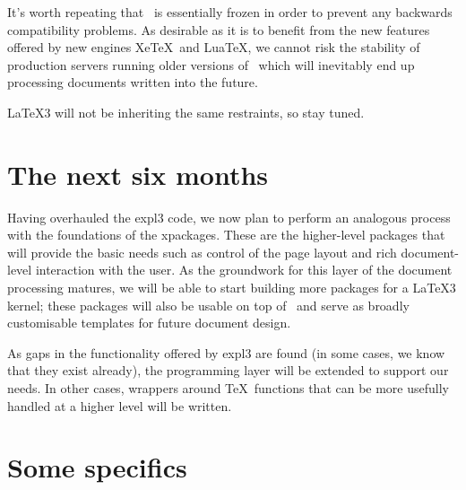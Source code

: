 \documentclass{ltnews}
\begin{document}
It's worth repeating that \LaTeXe\ is essentially frozen in order to
prevent any backwards compatibility problems. As desirable as it is
to benefit from the new features offered by new engines Xe\TeX\ and
Lua\TeX, we cannot risk the stability of production servers running
older versions of \LaTeXe\ which will inevitably end up processing
documents written into the future.

\LaTeX3 will not be inheriting the same restraints, so stay tuned.

\newpage
\section{The next six months}

Having overhauled the \textsf{expl3} code, we now plan to perform an
analogous process with the foundations of the
\textsf{xpackages}. These are the higher-level packages that will
provide the basic needs such as control of the page layout and rich
document-level interaction with the user. As the groundwork for this
layer of the document processing matures, we will be able to start
building more packages for a \LaTeX3 kernel; these packages will also
be usable on top of \LaTeXe\ and serve as broadly customisable
templates for future document design.

As gaps in the functionality offered by \textsf{expl3} are found (in
some cases, we know that they exist already), the programming layer
will be extended to support our needs. In other cases, wrappers around
\TeX\ functions that can be more usefully handled at a higher level
will be written.

\section{Some specifics}
\end{document}
